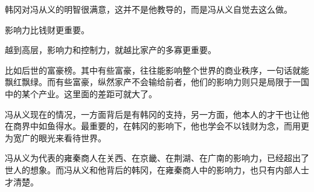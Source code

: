 韩冈对冯从义的明智很满意，这并不是他教导的，而是冯从义自觉去这么做。

影响力比钱财更重要。

越到高层，影响力和控制力，就越比家产的多寡更重要。

比如后世的富豪榜。其中有些富豪，往往能影响整个世界的商业秩序，一句话就能飘红飘绿。而有些富豪，纵然家产不会输给前者，他们的影响力则只是局限于一国中的某个产业。这里面的差距可就大了。

冯从义现在的情况，一方面背后是有韩冈的支持，另一方面，他本人的才干也让他在商界中如鱼得水。最重要的，在韩冈的影响下，他也学会不以钱财为念，而用更为宽广的眼光来看待世界。

冯从义为代表的雍秦商人在关西、在京畿、在荆湖、在广南的影响力，已经超出了世人的想象。而冯从义和他背后的韩冈，在雍秦商人中的影响力，也只有内部人士才清楚。

